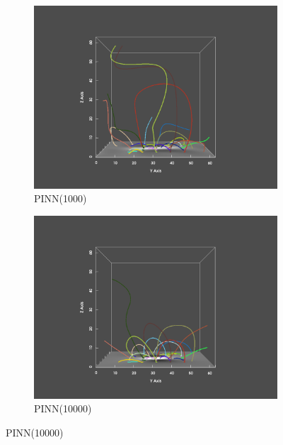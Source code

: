 \begin{figure}
  \begin{subfigure}{.5\linewidth}
    \centering
    \caption{PINN(1000)}
    \includegraphics[trim={6cm 1cm 6cm 2cm}, clip, width=\linewidth]{"img/PINN_001000_yz.pdf"}
  \end{subfigure}%
  \begin{subfigure}{.5\linewidth}
    \centering
    \caption{PINN(10000)}
    \includegraphics[trim={6cm 1cm 6cm 2cm}, clip, width=\linewidth]{"img/PINN_010000_yz.pdf"}
  \end{subfigure}


\end{figure}
